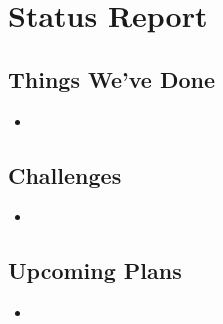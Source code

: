 \documentclass[11pt]{article}
\begin{document}
\section{Status Report}

\subsection{Things We've Done}
\begin{itemize}
\item
\end{itemize}

\subsection{Challenges}
\begin{itemize}
\item
\end{itemize}

\subsection{Upcoming Plans}
\begin{itemize}
\item
\end{itemize}
\end{document}
